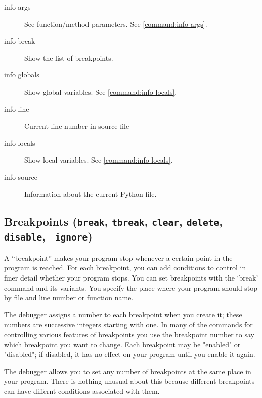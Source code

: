 \begin{description}

\item[info args]

See function/method parameters. See \ref{command:info-args}.

\item[info break]

Show the list of breakpoints. 

\item[info globals]

Show global variables. See \ref{command:info-locals}. 

\item[info line]

Current line number in source file

\item[info locals]

Show local variables. See \ref{command:info-locals}. 

\item[info source]

Information about the current Python file.

\end{description}

\subsection{Breakpoints ({\tt break}, {\tt tbreak}, {\tt clear},
  {\tt delete}, {\tt disable}, {\tt
  ignore})\label{subsubsection:brkpts}}

A ``breakpoint'' makes your program stop whenever a certain point in
the program is reached.  For each breakpoint, you can add conditions
to control in finer detail whether your program stops.  You can set
breakpoints with the `break' command and its variants. You specify the
place where your program should stop by file and line number or
function name.

The debugger assigns a number to each breakpoint when you create it;
these numbers are successive integers starting with one.  In many of
the commands for controlling various features of breakpoints you use
the breakpoint number to say which breakpoint you want to change.
Each breakpoint may be "enabled" or "disabled"; if disabled, it has no
effect on your program until you enable it again.

The debugger allows you to set any number of breakpoints at the same
place in your program.  There is nothing unusual about this because
different breakpoints can have differnt conditions associated with them.

